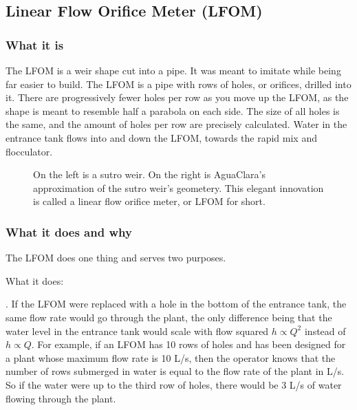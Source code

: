 \documentclass[letterpaper,10pt,english]{sphinxmanual}
\let\sphinxpxdimen\pdfpxdimen\else\newdimen\sphinxpxdimen
\begin{document}
\subsection{Linear Flow Orifice Meter (LFOM)}
\label{\detokenize{Flow_Control_and_Measurement/FCM_Design:linear-flow-orifice-meter-lfom}}\label{\detokenize{Flow_Control_and_Measurement/FCM_Design:lfom}}

\subsubsection{What it is}
\label{\detokenize{Flow_Control_and_Measurement/FCM_Design:id5}}
The LFOM is a weir shape cut into a pipe. It was meant to imitate  while being far easier to build. The LFOM is a pipe with rows of holes, or orifices, drilled into it. There are progressively fewer holes per row as you move up the LFOM, as the shape is meant to resemble half a parabola on each side. The size of all holes is the same, and the amount of holes per row are precisely calculated. Water in the entrance tank flows into and down the LFOM, towards the rapid mix and flocculator.

\begin{figure}[htbp]
\centering
\capstart

\noindent\sphinxincludegraphics[width=600\sphinxpxdimen]{{sutro_v_lfom}.png}
\caption{On the left is a sutro weir. On the right is AguaClara’s approximation of the sutro weir’s geometery. This elegant innovation is called a linear flow orifice meter, or LFOM for short.}\label{\detokenize{Flow_Control_and_Measurement/FCM_Design:id16}}\label{\detokenize{Flow_Control_and_Measurement/FCM_Design:sutro-v-lfom}}\end{figure}


\subsubsection{What it does and why}
\label{\detokenize{Flow_Control_and_Measurement/FCM_Design:id6}}
The LFOM does one thing and serves two purposes.

What it does:

 . If the LFOM were replaced with a hole in the bottom of the entrance tank, the same flow rate would go through the plant, the only difference being that the water level in the entrance tank would scale with flow squared \(h \propto Q^2\) instead of \(h \propto Q\). For example, if an LFOM has 10 rows of holes and has been designed for a plant whose maximum flow rate is 10 L/s, then the operator knows that the number of rows submerged in water is equal to the flow rate of the plant in L/s. So if the water were up to the third row of holes, there would be 3 L/s of water flowing through the plant.
\end{document}
